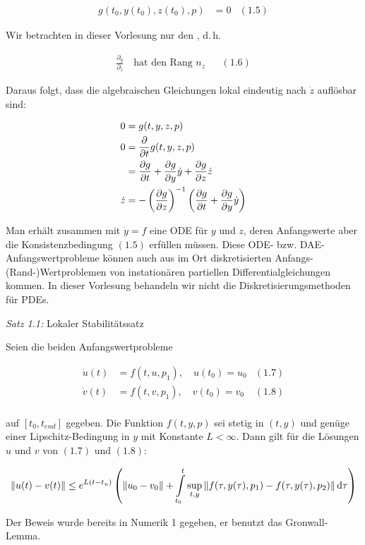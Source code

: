 \begin{align*}
g(t_0,y(t_0), z(t_0),p)&=0 & (1.5)
\end{align*}

Wir betrachten in dieser Vorlesung nur den , d.\,h.

\begin{align*}
\frac{\partial_g}{\partial_z} \quad \text{hat den Rang } n_z & & (1.6)
\end{align*}

Daraus folgt, dass die algebraischen Gleichungen lokal eindeutig nach $\dot z$ auflösbar sind:

\begin{align*}
0 &= g(t,y,z,p) \\
0 &= \frac\partial{\partial t} g(t,y,z,p) \\
&= \frac{\partial g}{\partial t} + \frac{\partial g}{\partial y} \dot y + \frac{\partial g}{\partial z} \dot z \\
\dot z &= -\left(\frac{\partial g}{\partial z}\right)^{-1} \left(\frac{\partial g}{\partial t} + \frac{\partial g}{\partial y} \dot y \right)
\end{align*}

Man erhält zusammen mit $\dot y = f$ eine ODE für $y$ und $z$, deren Anfangswerte aber die Konsistenzbedingung $(1.5)$ erfüllen müssen. Diese ODE- bzw. DAE-Anfangswertprobleme können auch aus im Ort diskretisierten Anfangs-(Rand-)Wertproblemen von instationären partiellen Differentialgleichungen kommen. In dieser Vorlesung behandeln wir nicht die Diskretisierungsmethoden für PDEs.

\emph{Satz 1.1:} Lokaler Stabilitätssatz

Seien die beiden Anfangswertprobleme

\begin{align*}
\dot u(t) &= f(t,u,p_1), \quad u(t_0) = u_0 & (1.7) \\
\dot v(t) &= f(t,v,p_1), \quad v(t_0) = v_0 & (1.8) \\
\end{align*}

auf $[t_0,t_{end}]$ gegeben. Die Funktion $f(t,y,p)$ sei stetig in $(t,y)$ und genüge einer Lipschitz-Bedingung in $y$ mit Konstante $L < \infty$. Dann gilt für die Lösungen $u$ und $v$ von $(1.7)$ und $(1.8)$:

\[ \|u(t)-v(t)\| \leq e^{L(t-t_{u})} \left(\|u_0-v_0\| + \int\limits_{t_0}^t \sup_{t,y} \|f( \tau, y(\tau), p_1) - f(\tau, y(\tau), p_2) \| \,\mathrm d \tau\right)\]

Der Beweis wurde bereits in Numerik 1 gegeben, er benutzt das Gronwall-Lemma.

